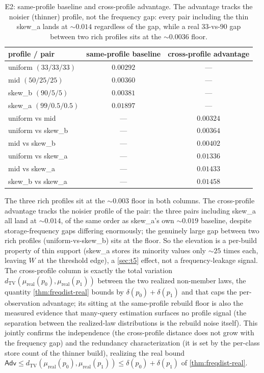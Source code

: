 \documentclass[acmsmall,review]{acmart}
\newcommand{\TV}{d_{\mathrm{TV}}}
\newcommand{\W}{W}                          %
\newcommand{\Adv}{\mathsf{Adv}}             %
\newcommand{\lawreal}{\mu_{\mathrm{real}}}  %
\begin{document}
\begin{table}[t]
  \centering
  \caption{E2: same-profile baseline and cross-profile advantage. The advantage tracks the
  noisier (thinner) profile, not the frequency gap: every pair including the thin skew\_a
  lands at $\sim 0.014$ regardless of the gap, while a real $33$-vs-$90$ gap between two
  rich profiles sits at the $\sim 0.0036$ floor.}
  \label{tab:e2}
  \begin{tabular}{lcc}
    \toprule
    profile / pair & same-profile baseline & cross-profile advantage \\
    \midrule
    uniform $(33/33/33)$ & $0.00292$ & --- \\
    mid $(50/25/25)$     & $0.00360$ & --- \\
    skew\_b $(90/5/5)$   & $0.00381$ & --- \\
    skew\_a $(99/0.5/0.5)$ & $0.01897$ & --- \\
    \midrule
    uniform vs mid       & --- & $0.00324$ \\
    uniform vs skew\_b   & --- & $0.00364$ \\
    mid vs skew\_b       & --- & $0.00402$ \\
    uniform vs skew\_a   & --- & $0.01336$ \\
    mid vs skew\_a       & --- & $0.01433$ \\
    skew\_b vs skew\_a   & --- & $0.01458$ \\
    \bottomrule
  \end{tabular}
\end{table}

The three rich profiles sit at the $\sim 0.003$ floor in both columns. The cross-profile
advantage tracks the noisier profile of the pair: the three pairs including skew\_a all
land at $\sim 0.014$, of the same order as skew\_a's own $\sim 0.019$ baseline, despite
storage-frequency gaps differing enormously; the genuinely large gap between two rich
profiles (uniform-vs-skew\_b) sits at the floor. So the elevation is a per-build property
of thin support (skew\_a stores its minority values only $\sim 25$ times each, leaving $\W$
at the threshold edge), a \cref{sec:t5} effect, not a frequency-leakage signal. The
cross-profile column is exactly the total variation $\TV(\lawreal(p_0), \lawreal(p_1))$
between the two realized non-member laws, the quantity \cref{thm:freqdist-real} bounds by
$\delta(p_0)+\delta(p_1)$ and that caps the per-observation advantage; its sitting at the
same-profile rebuild floor is also the measured evidence that many-query estimation
surfaces no profile signal (the separation between the realized-law distributions is the
rebuild noise itself).
This jointly confirms the independence (the cross-profile distance does not grow with the
frequency gap) and the redundancy characterization (it is set by the per-class store count
of the thinner build), realizing the real bound
$\Adv \le \TV(\lawreal(p_0), \lawreal(p_1)) \le \delta(p_0)+\delta(p_1)$ of
\cref{thm:freqdist-real}.
\end{document}
